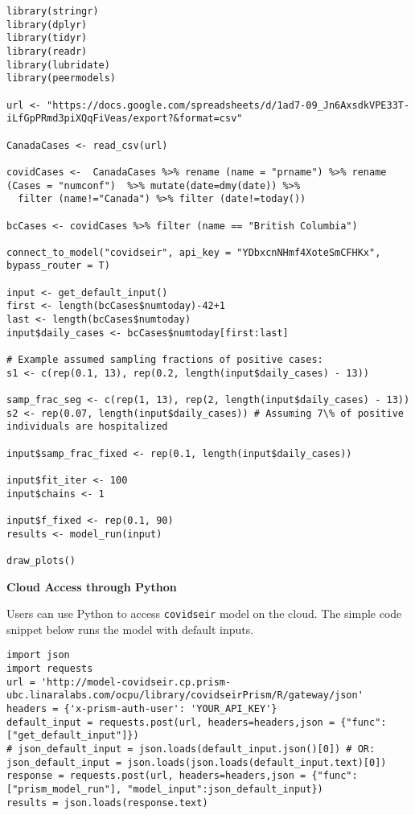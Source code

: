 \documentclass[
]{book}
\begin{document}
\begin{verbatim}
library(stringr)
library(dplyr)
library(tidyr)
library(readr)
library(lubridate)
library(peermodels)

url <- "https://docs.google.com/spreadsheets/d/1ad7-09_Jn6AxsdkVPE33T-iLfGpPRmd3piXQqFiVeas/export?&format=csv"

CanadaCases <- read_csv(url)

covidCases <-  CanadaCases %>% rename (name = "prname") %>% rename (Cases = "numconf")  %>% mutate(date=dmy(date)) %>%
  filter (name!="Canada") %>% filter (date!=today())

bcCases <- covidCases %>% filter (name == "British Columbia")

connect_to_model("covidseir", api_key = "YDbxcnNHmf4XoteSmCFHKx", bypass_router = T)

input <- get_default_input()
first <- length(bcCases$numtoday)-42+1
last <- length(bcCases$numtoday)
input$daily_cases <- bcCases$numtoday[first:last]

# Example assumed sampling fractions of positive cases:
s1 <- c(rep(0.1, 13), rep(0.2, length(input$daily_cases) - 13))

samp_frac_seg <- c(rep(1, 13), rep(2, length(input$daily_cases) - 13))
s2 <- rep(0.07, length(input$daily_cases)) # Assuming 7\% of positive individuals are hospitalized

input$samp_frac_fixed <- rep(0.1, length(input$daily_cases))

input$fit_iter <- 100
input$chains <- 1

input$f_fixed <- rep(0.1, 90)
results <- model_run(input)

draw_plots()
\end{verbatim}

\textbf{Cloud Access through Python}

Users can use Python to access \texttt{covidseir} model on the cloud. The simple code snippet below runs the model with default inputs.

\begin{verbatim}
import json
import requests
url = 'http://model-covidseir.cp.prism-ubc.linaralabs.com/ocpu/library/covidseirPrism/R/gateway/json'
headers = {'x-prism-auth-user': 'YOUR_API_KEY'}
default_input = requests.post(url, headers=headers,json = {"func":["get_default_input"]})
# json_default_input = json.loads(default_input.json()[0]) # OR:
json_default_input = json.loads(json.loads(default_input.text)[0])
response = requests.post(url, headers=headers,json = {"func":["prism_model_run"], "model_input":json_default_input})
results = json.loads(response.text)
\end{verbatim}
\end{document}
